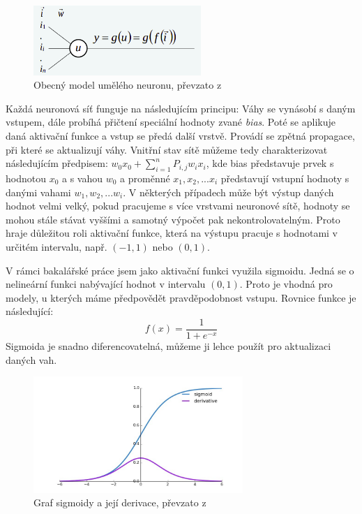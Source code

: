 \begin{figure}[!htbp]
    \centering
    \includegraphics[width=240px]{obrazky-figures/neuron.png}
    \caption{Obecný model umělého neuronu, převzato z \cite{PrednaskaIZU9}}
\end{figure}

Každá neuronová síť funguje na následujícím principu: Váhy se vynásobí s daným vstupem, dále probíhá přičtení speciální hodnoty zvané \textit{bias}. Poté se aplikuje daná aktivační funkce a vstup se předá další vrstvě. Provádí se zpětná propagace, při které se aktualizují váhy. Vnitřní stav sítě můžeme tedy charakterizovat následujícím předpisem: $w_0x_0 + \sum_{i=1}^{n}P_{i,j}w_ix_i$, kde bias představuje prvek s hodnotou $x_0$ a s vahou $w_0$ a proměnné $x_1, x_2, ...x_i$ představují vstupní hodnoty s danými vahami $w_1, w_2, ...w_i$. V některých případech může být výstup daných hodnot velmi velký, pokud pracujeme s více vrstvami neuronové sítě, hodnoty se mohou stále stávat vyššími a samotný výpočet pak nekontrolovatelným. Proto hraje důležitou roli aktivační funkce, která na výstupu pracuje s hodnotami v určitém intervalu, např. $(-1, 1)$ nebo $(0, 1)$. \cite{MediumDeepLearning} 

V rámci bakalářské práce jsem jako aktivační funkci využila sigmoidu. Jedná se o nelineární funkci nabývající hodnot v intervalu $(0, 1)$. Proto je vhodná pro modely, u kterých máme předpovědět pravděpodobnost vstupu. Rovnice funkce je následující:
$$f(x)=\frac{1}{1+e^{-x}}$$
Sigmoida je snadno diferencovatelná, můžeme ji lehce použít pro aktualizaci daných vah.

\begin{figure}[!htbp]
    \centering
    \includegraphics[width=300px]{obrazky-figures/sigmoid.jpeg}
    \caption{Graf sigmoidy a její derivace, převzato z \cite{MediumDeepLearning}}
\end{figure}

